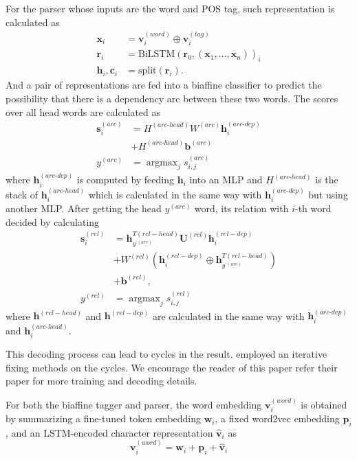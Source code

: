 \documentclass[11pt,a4paper]{article}
\DeclareMathOperator*{\argmax}{argmax}
\begin{document}
For the parser whose inputs are the word and POS tag,
such representation is calculated as
\begin{align*}
\mathbf{x}_i & =  \mathbf{v}_i^{(word)} \oplus \mathbf{v}_i^{(tag)} \\
\mathbf{r}_i & =  \text{BiLSTM}(\mathbf{r}_0, (\mathbf{x}_1, ..., \mathbf{x}_n))_i \\
\mathbf{h}_i, \mathbf{c}_i & = \text{split}(\mathbf{r}_i)\text{.}
\end{align*}
And a pair of representations are fed into a biaffine classifier
to predict the possibility that there is a dependency arc between these two words.
The scores over all head words are calculated as
\begin{align*}
\mathbf{s}_i^{(arc)} & = H^{(arc\text{-}head)} W^{(arc)} \mathbf{h}_i^{(arc\text{-}dep)} \\
& + H^{(arc\text{-}head)} \mathbf{b}^{(arc)} \\
y^{(arc)} & = \argmax_{j} s_{i, j}^{(arc)}
\end{align*}
where $\mathbf{h}_i^{(arc\text{-}dep)}$ is computed by feeding $\mathbf{h}_i$ into an MLP
and $H^{(arc\text{-}head)}$ is the stack of $\mathbf{h}_i^{(arc\text{-}head)}$
which is calculated in the same way with $\mathbf{h}_i^{(arc\text{-}dep)}$
but using another MLP.
After getting the head $y^{(arc)}$ word,
its relation with $i$-th word decided by calculating 
\begin{align*}
\mathbf{s}_i^{(rel)} & = \mathbf{h}^{T(rel-head)}_{y^{‘(arc)}} \mathbf{U}^{(rel)} \mathbf{h}_i^{(rel-dep)} \\
& + W^{(rel)} (\mathbf{h}_i^{(rel-dep)} \oplus \mathbf{h}^{T(rel-head)}_{y^{‘(arc)}}) \\
& + \mathbf{b}^{(rel)}, \\
y^{(rel)} & = \argmax_{j} s_{i, j}^{(rel)}
\end{align*}
where $\mathbf{h}^{(rel-head)}$ and $\mathbf{h}^{(rel-dep)}$
are calculated in the same way with $\mathbf{h}_i^{(arc\text{-}dep)}$ and $\mathbf{h}_i^{(arc\text{-}head)}$.

This decoding process can lead to cycles in the result.
\cite{dozat-qi-manning:2017:K17-3} employed an iterative fixing methods on the cycles.
We encourage the reader of this paper refer their paper for more training and decoding details.

For both the biaffine tagger and parser, 
the word embedding $\mathbf{v}_i^{(word)}$ is obtained by summarizing 
a fine-tuned token embedding $\mathbf{w}_i$, a fixed word2vec embedding $\mathbf{p}_i$, and an LSTM-encoded
character representation $\mathbf{\hat{v}}_i$ as
\[
\mathbf{v}_i^{(word)} = \mathbf{w}_i + \mathbf{p}_i + \mathbf{\hat{v}}_i
\]
\end{document}
